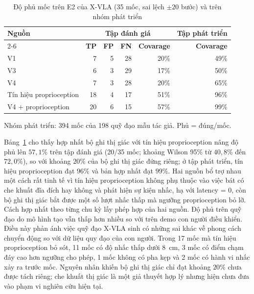 \begin{table}[htbp]
\centering\small
\caption{Độ phủ mốc trên E2 của X-VLA (35 mốc, sai lệch $\pm 20$ bước) và trên nhóm phát triển}
\label{tab:xvla-writer-recall}
\setlength{\tabcolsep}{4pt}
\begin{tabular}{|l|r|r|r|r|r|}
\hline
\multirow{2}{*}{\textbf{Nguồn}} & \multicolumn{4}{c|}{\textbf{Tập đánh giá}} & \multicolumn{1}{c|}{\textbf{Tập phát triển}} \\
\cline{2-6}
 & \textbf{TP} & \textbf{FP} & \textbf{FN} & \textbf{Covarage} & \textbf{Covarage} \\ \hline
V1 & 7 & 5 & 28 & 20\% & 49\% \\ \hline
V3 & 6 & 3 & 29 & 17\% & 50\% \\ \hline
V4 & 7 & 3 & 28 & 20\% & 65\% \\ \hline
Tín hiệu proprioception & 18 & 4 & 17 & 51\% & 96\% \\ \hline
V4 + proprioception  & 20 & 6 & 15 & 57\% & 99\% \\ \hline
\end{tabular}
\par\smallskip
{\footnotesize Nhóm phát triển: 394 mốc của 198 quỹ đạo mẫu tác giả. Phủ = đúng/mốc.\par}
\end{table}

Bảng~\ref{tab:xvla-writer-recall} cho thấy hợp nhất bộ ghi thị giác với tín hiệu proprioception nâng độ phủ lên $57{,}1$\% trên tập đánh giá (20/35 mốc; khoảng Wilson 95\% từ $40{,}8$\% đến $72{,}0$\%), so với khoảng $20$\% của bộ ghi thị giác đứng riêng; ở tập phát triển, tín hiệu proprioception đạt $96$\% và bản hợp nhất đạt $99$\%. Hai nguồn bổ trợ nhau một cách rất tinh tế vì tín hiệu proprioception không phụ thuộc vào việc bát có che khuất đĩa đích hay không và phát hiện sự kiện nhấc, hạ với latency = 0, còn bộ ghi thị giác bắt được một số lượt nhấc thấp mà ngưỡng proprioception bỏ lỡ. Cách hợp nhất theo từng chu kỳ lấy phép hợp của hai nguồn. Độ phủ trên quỹ đạo do mô hình tạo vẫn thấp hơn nhiều so với trên demo con người điều khiển. Điều này phản ánh việc quỹ đạo X-VLA sinh có những sai khác về phong cách chuyển động so với dữ liệu quy đạo của con người. Trong 17 mốc mà tín hiệu proprioception bỏ sót, 11 mốc có độ nhấc thấp dưới 8~cm, 3 mốc có điểm chạm đáy cao hơn ngưỡng cho phép, 1 mốc không có pha kẹp và 2 mốc có hành vi nhấc xảy ra trước mốc. Nguyên nhân khiến bộ ghi thị giác chỉ đạt khoảng $20$\% chưa được tách riêng; che khuất thị giác là một giả thuyết hợp lý nhưng hiện chưa đưa vào phạm vi nghiên cứu hiện tại.

